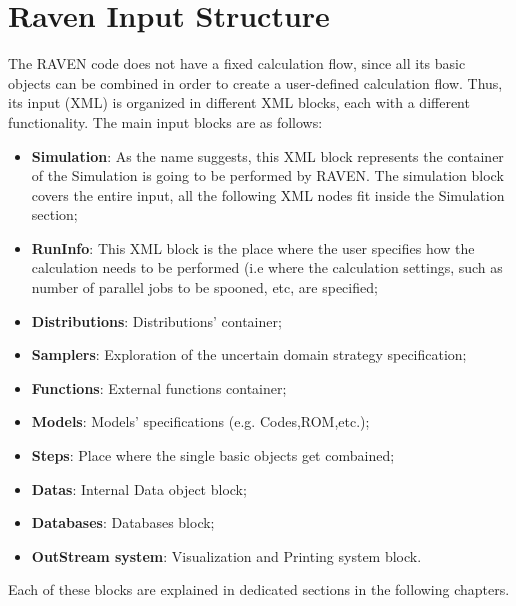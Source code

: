 \section{Raven Input Structure  \\ \vspace{2 mm} {\small }}
The RAVEN code does not have a fixed calculation flow, since all its basic objects can be combined in order to create a user-defined calculation flow. Thus, its input (XML) is organized in different XML blocks, each with a different functionality. 
The main input blocks are as follows:
\begin{itemize}
\item \textbf{Simulation}: As the name suggests, this XML block represents the container of the Simulation is going to be performed by RAVEN. The simulation block covers the entire input, all the following XML nodes fit inside the Simulation section;
\item \textbf{RunInfo}: This XML block is the place where the user specifies how the calculation needs to be performed (i.e where the calculation settings, such as number of parallel jobs to be spooned, etc,  are specified;
\item \textbf{Distributions}: Distributions' container;
\item \textbf{Samplers}: Exploration of the uncertain domain strategy specification;
\item \textbf{Functions}: External functions container;
\item \textbf{Models}: Models' specifications (e.g. Codes,ROM,etc.);
\item \textbf{Steps}: Place where the single basic objects get combained;
\item \textbf{Datas}: Internal Data object block;
\item \textbf{Databases}: Databases block;
\item \textbf{OutStream system}: Visualization and Printing system block.
\end{itemize} 
Each of these blocks are explained in dedicated sections in the following chapters. 



